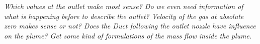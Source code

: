 {\color{greenColor}\itshape
Which values at the outlet make most sense?
Do we even need information of what is happening before to describe the outlet?
Velocity of the gas at absolute zero makes sense or not?
Does the Duct following the outlet nozzle have influence on the plume?
Get some kind of formulations of the mass flow inside the plume.
}
\cite{putignano2012supersonic}
